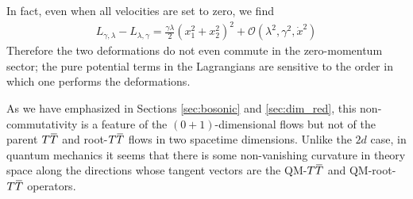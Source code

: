 \documentclass[12pt]{article}
\numberwithin{equation}{section}
\newcommand{\overbar}[1]{\mkern 1.5mu\overline{\mkern-1.5mu#1\mkern-1.5mu}\mkern 1.5mu}
\def\TT{{T\overbar{T}}}
\begin{document}
In fact, even when all velocities are set to zero, we find 
%
\begin{align}
    L_{\gamma, \lambda} - L_{\lambda, \gamma} = \frac{\gamma \lambda}{2} \left( x_1^2 + x_2^2 \right)^2 + \mathcal{O} \left( \lambda^2, \gamma^2, \dot{x}^2 \right)
\end{align}
%
Therefore the two deformations do not even commute in the zero-momentum sector; the pure potential terms in the Lagrangians are sensitive to the order in which one performs the deformations.

As we have emphasized in Sections \ref{sec:bosonic} and \ref{sec:dim_red}, this non-commutativity is a feature of the $(0+1)$-dimensional flows but not of the parent $\TT$ and root-$\TT$ flows in two spacetime dimensions. Unlike the $2d$ case, in quantum mechanics it seems that there is some non-vanishing curvature in theory space along the directions whose tangent vectors are the QM-$\TT$ and QM-root-$\TT$ operators.



\end{document}
